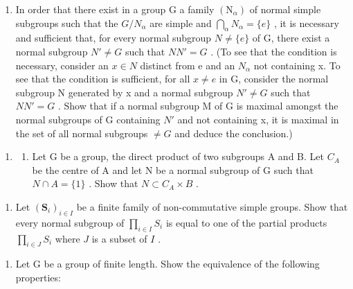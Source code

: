 \begin{enumerate}
\def\labelenumi{(\alph{enumi})}
\setcounter{enumi}{1}
\tightlist
\item
  In order that there exist in a group G a family \((\mathrm{N}_{\alpha})\) of normal simple subgroups such that the \(G/N_{\alpha}\) are simple and \(\bigcap_{\alpha} N_{\alpha} = \{e\}\) , it is necessary and sufficient that, for every normal subgroup \(N \neq \{e\}\) of G, there exist a normal subgroup \(N' \neq G\) such that \(NN' = G\) . (To see that the condition is necessary, consider an \(x \in N\) distinct from e and an \(N_{\alpha}\) not containing x. To see that the condition is sufficient, for all \(x \neq e\) in G, consider the normal subgroup N generated by x and a normal subgroup \(N' \neq G\) such that \(NN' = G\) . Show that if a normal subgroup M of G is maximal amongst the normal subgroups of G containing \(N'\) and not containing x, it is maximal in the set of all normal subgroups \(\neq G\) and deduce the conclusion.)
\end{enumerate}

\begin{enumerate}
\def\labelenumi{\arabic{enumi}.}
\setcounter{enumi}{19}
\tightlist
\item
  \begin{enumerate}
  \def\labelenumii{(\alph{enumii})}
  \tightlist
  \item
    Let G be a group, the direct product of two subgroups A and B. Let \(C_{A}\) be the centre of A and let N be a normal subgroup of G such that \(N \cap A = \{1\}\) . Show that \(N \subset C_{A} \times B\) .
  \end{enumerate}
\end{enumerate}

\begin{enumerate}
\def\labelenumi{(\alph{enumi})}
\setcounter{enumi}{1}
\tightlist
\item
  Let \((\mathbf{S}_i)_{i\in I}\) be a finite family of non-commutative simple groups. Show that every normal subgroup of \(\prod_{i\in I}S_i\) is equal to one of the partial products \(\prod_{i\in J}S_i\) where \(J\) is a subset of \(I\) .
\end{enumerate}

\begin{enumerate}
\def\labelenumi{\arabic{enumi}.}
\setcounter{enumi}{20}
\tightlist
\item
  Let G be a group of finite length. Show the equivalence of the following properties:
\end{enumerate}

